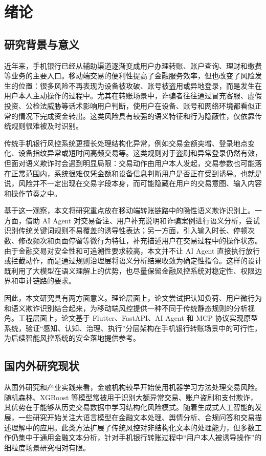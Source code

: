 \documentclass{xduugthesis}
\begin{document}
\chapter{绪论}

\section{研究背景与意义}

近年来，手机银行已经从辅助渠道逐渐变成用户办理转账、账户查询、理财和缴费等业务的主要入口。移动端交易的便利性提高了金融服务效率，但也改变了风险发生的位置：很多风险不再表现为设备被攻破、账号被盗用或异地登录，而是发生在用户本人主动操作的过程中。尤其在转账场景中，诈骗者往往通过冒充客服、虚假投资、公检法威胁等话术影响用户判断，使用户在设备、账号和网络环境都看似正常的情况下完成资金转出。这类风险具有较强的语义特征和行为隐蔽性，仅依靠传统规则很难被及时识别\cite{ahi2025risks}。

传统手机银行风控系统更擅长处理结构化异常，例如交易金额突增、登录地点变化、设备指纹异常或短时间高频交易等。这类规则对于盗刷和异常登录仍然有效，但面对语义欺诈时会遇到明显局限：交易动作由用户本人发起，交易参数也可能落在正常范围内，系统很难仅凭金额和设备信息判断用户是否正在受到诱导。也就是说，风险并不一定出现在交易字段本身，而可能隐藏在用户的交易意图、输入内容和操作节奏之中。

基于这一观察，本文将研究重点放在移动端转账链路中的隐性语义欺诈识别上。一方面，借助 AI Agent 对交易备注、用户补充说明和诈骗案例进行语义分析，尝试识别传统关键词规则不易覆盖的诱导性表达；另一方面，引入输入时长、停顿次数、修改频次和页面停留等微行为特征，补充描述用户在交易过程中的操作状态。由于金融交易对安全性和可追溯性要求较高，本文并不让 AI Agent 直接执行放行或拦截动作，而是通过规则治理层将语义分析结果收敛为确定性指令。这样的设计既利用了大模型在语义理解上的优势，也尽量保留金融风控系统对稳定性、权限边界和审计链路的要求。

因此，本文研究具有两方面意义。理论层面上，论文尝试把认知负荷、用户微行为和语义欺诈识别结合起来，为移动端风控提供一种不同于传统静态规则的分析视角。工程层面上，论文基于 Flutter、FastAPI、AI Agent 和 MCP 协议实现原型系统，验证“感知、认知、治理、执行”分层架构在手机银行转账场景中的可行性，为后续智能风控系统的安全落地提供参考。

\section{国内外研究现状}

从国外研究和产业实践来看，金融机构较早开始使用机器学习方法处理交易风险。随机森林、XGBoost 等模型常被用于识别大额异常交易、账户盗刷和支付欺诈，其优势在于能够从历史交易数据中学习结构化风险模式\cite{dubey2025transformer}。随着生成式人工智能的发展，一些研究开始关注大语言模型在金融文本处理、舆情分析、合规问答和交易描述理解中的应用。此类方法扩展了传统风控对非结构化文本的处理能力，但多数工作仍集中于通用金融文本分析，针对手机银行转账过程中“用户本人被诱导操作”的细粒度场景研究相对有限。
\end{document}
